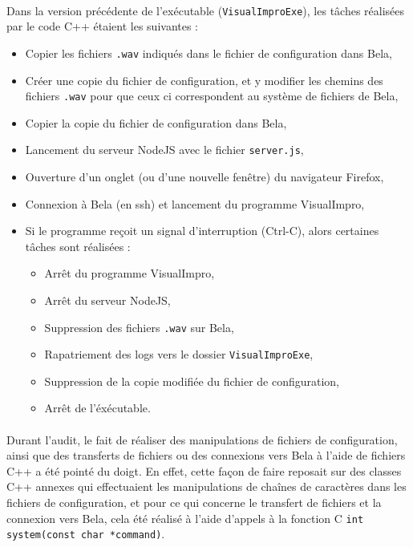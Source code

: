 \paragraph{}
Dans la version précédente de l'exécutable (\verb!VisualImproExe!),
les tâches réalisées par le code C++ étaient les suivantes :
\begin{itemize}
  \item Copier les fichiers \verb!.wav! indiqués dans le fichier de
    configuration dans Bela,
  \item Créer une copie du fichier de configuration, et y modifier les
    chemins des fichiers \verb!.wav! pour que ceux ci correspondent au
    système de fichiers de Bela,
  \item Copier la copie du fichier de configuration dans Bela,
  \item Lancement du serveur NodeJS avec le fichier \verb!server.js!,
  \item Ouverture d'un onglet (ou d'une nouvelle fenêtre) du
    navigateur Firefox,
  \item Connexion à Bela (en ssh) et lancement du programme
    VisualImpro,
  \item Si le programme reçoit un signal d'interruption (Ctrl-C),
    alors certaines tâches sont réalisées :
  \begin{itemize}
    \item Arrêt du programme VisualImpro,
    \item Arrêt du serveur NodeJS,
    \item Suppression des fichiers \verb!.wav! sur Bela,
    \item Rapatriement des logs vers le dossier \verb!VisualImproExe!,
    \item Suppression de la copie modifiée du fichier de configuration,
    \item Arrêt de l'éxécutable.
  \end{itemize}
\end{itemize}
\paragraph{}
Durant l'audit, le fait de réaliser des manipulations de fichiers de
configuration, ainsi que des transferts de fichiers ou des connexions
vers Bela à l'aide de fichiers C++ a été pointé du doigt. En effet,
cette façon de faire reposait sur des classes C++ annexes qui
effectuaient les manipulations de chaînes de caractères dans les
fichiers de configuration, et pour ce qui concerne le transfert de
fichiers et la connexion vers Bela, cela été réalisé à l'aide d'appels
à la fonction C \verb!int system(const char *command)!.
